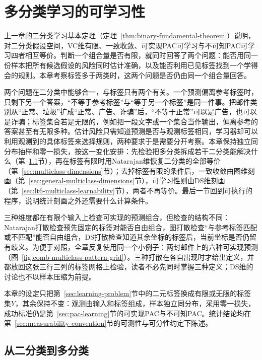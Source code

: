 \chapter{多分类学习的可学习性}
\label{chap:multiclass-learnability}

上一章的二分类学习基本定理（定理~\ref{thm:binary-fundamental-theorem}）说明，对二分类假设空间，VC维有限、一致收敛、可实现PAC可学习与不可知PAC可学习四者相互等价。判断一个组合量是否有限，就同时回答了两个问题：能否用同一份样本把所有候选假设的风险同时估计准确，以及能否利用已见标签找到一个学得会的规则。本章考察标签多于两类时，这两个问题是否仍由同一个组合量回答。

两个问题在二分类中能够合一，与标签只有两个有关。一个预测偏离参考标签时，只剩下另一个答案，“不等于参考标签”与“等于另一个标签”是同一件事。把邮件类别从“正常、垃圾”扩成“正常、广告、诈骗”后，“不等于正常”可以是广告，也可以是诈骗；标签集合若是无限的，例如把一段文字或一个集合当作输出，偏离参考的答案甚至有无限多种。估计风险只需知道预测是否与观测标签相同，学习器却可以利用观测到的具体标签来选择规则，两种要求于是需要分开考察。本章保持独立同分布抽样和零一损失，按这一变化安排：先检验把多分类拆成若干二分类能解决什么（第~\ref{sec:multiclass-setting}节），再在标签有限时用Natarajan维恢复二分类的全部等价（第~\ref{sec:multiclass-dimensions}节）；去掉标签有限的条件后，一致收敛由图维刻画（第~\ref{sec:general-multiclass-dimensions}节），可学习性则由DS维刻画（第~\ref{sec:lt6-multiclass-learnability}节），两者不再等价。最后一节回到可执行的程序，说明统计刻画之外还需要什么计算条件。

三种维度都在有限个输入上检查可实现的预测组合，但检查的结构不同：Natarajan打散检查预先固定的标签对能否自由组合，图打散检查“与参考标签匹配或不匹配”能否自由组合，DS打散检查知道其余坐标的标签后，当前坐标是否仍留有歧义。为便于对照，全章反复使用同一个小例子：两封邮件上的六种可实现预测（图~\ref{fig:comb-multiclass-pattern-grid}）。三种打散在各自出现时才给出定义，并都放回这张三行三列的标签网格上检验，读者不必先同时掌握三种定义；DS维的讨论也不以样本压缩为前提。

本章的设定只把第~\ref{sec:learning-problem}节中的二元标签换成有限或无限的标签集$Y$，其余保持不变：观测由输入和标签组成，样本独立同分布，采用零一损失，成功标准仍是第~\ref{sec:pac-learning}节的可实现PAC与不可知PAC。统计结论均在第~\ref{sec:measurability-convention}节的可测性与可分性约定下陈述。

\section{从二分类到多分类}
\label{sec:multiclass-setting}

